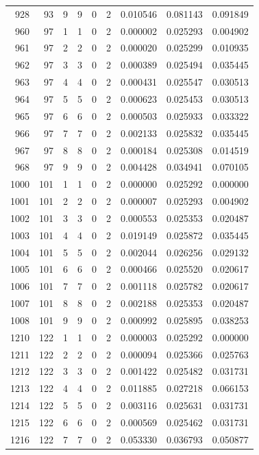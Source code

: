 \begin{longtable}{rrrrrrrrr}
928 & 93 & 9 & 9 & 0 & 2 & 0.010546 & 0.081143 & 0.091849 \\
960 & 97 & 1 & 1 & 0 & 2 & 0.000002 & 0.025293 & 0.004902 \\
961 & 97 & 2 & 2 & 0 & 2 & 0.000020 & 0.025299 & 0.010935 \\
962 & 97 & 3 & 3 & 0 & 2 & 0.000389 & 0.025494 & 0.035445 \\
963 & 97 & 4 & 4 & 0 & 2 & 0.000431 & 0.025547 & 0.030513 \\
964 & 97 & 5 & 5 & 0 & 2 & 0.000623 & 0.025453 & 0.030513 \\
965 & 97 & 6 & 6 & 0 & 2 & 0.000503 & 0.025933 & 0.033322 \\
966 & 97 & 7 & 7 & 0 & 2 & 0.002133 & 0.025832 & 0.035445 \\
967 & 97 & 8 & 8 & 0 & 2 & 0.000184 & 0.025308 & 0.014519 \\
968 & 97 & 9 & 9 & 0 & 2 & 0.004428 & 0.034941 & 0.070105 \\
1000 & 101 & 1 & 1 & 0 & 2 & 0.000000 & 0.025292 & 0.000000 \\
1001 & 101 & 2 & 2 & 0 & 2 & 0.000007 & 0.025293 & 0.004902 \\
1002 & 101 & 3 & 3 & 0 & 2 & 0.000553 & 0.025353 & 0.020487 \\
1003 & 101 & 4 & 4 & 0 & 2 & 0.019149 & 0.025872 & 0.035445 \\
1004 & 101 & 5 & 5 & 0 & 2 & 0.002044 & 0.026256 & 0.029132 \\
1005 & 101 & 6 & 6 & 0 & 2 & 0.000466 & 0.025520 & 0.020617 \\
1006 & 101 & 7 & 7 & 0 & 2 & 0.001118 & 0.025782 & 0.020617 \\
1007 & 101 & 8 & 8 & 0 & 2 & 0.002188 & 0.025353 & 0.020487 \\
1008 & 101 & 9 & 9 & 0 & 2 & 0.000992 & 0.025895 & 0.038253 \\
1210 & 122 & 1 & 1 & 0 & 2 & 0.000003 & 0.025292 & 0.000000 \\
1211 & 122 & 2 & 2 & 0 & 2 & 0.000094 & 0.025366 & 0.025763 \\
1212 & 122 & 3 & 3 & 0 & 2 & 0.001422 & 0.025482 & 0.031731 \\
1213 & 122 & 4 & 4 & 0 & 2 & 0.011885 & 0.027218 & 0.066153 \\
1214 & 122 & 5 & 5 & 0 & 2 & 0.003116 & 0.025631 & 0.031731 \\
1215 & 122 & 6 & 6 & 0 & 2 & 0.000569 & 0.025462 & 0.031731 \\
1216 & 122 & 7 & 7 & 0 & 2 & 0.053330 & 0.036793 & 0.050877 \\

\end{longtable}
